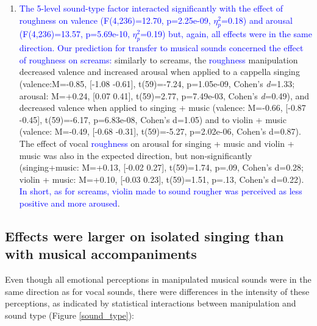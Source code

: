 \documentclass[openacc]{rsprocb_new}%
\begin{document}
\begin{enumerate}
\item \textcolor{blue}{The 5-level sound-type factor interacted significantly with the effect of roughness on valence (F(4,236)=12.70, p=2.25e-09, $\eta_p^2$=0.18) and arousal (F(4,236)=13.57, p=5.69e-10, $\eta_p^2$=0.19) but, again, all effects were in the same direction. Our prediction for transfer to musical sounds concerned the effect of roughness on screams:} similarly to screams, the \textcolor{blue}{roughness} manipulation decreased valence and increased arousal when applied to a cappella singing (valence:M=-0.85, [-1.08 -0.61], t(59)=-7.24, p=1.05e-09, Cohen's \emph{d}=1.33; arousal: M=+0.24, [0.07 0.41], t(59)=2.77, p=7.49e-03, Cohen's \emph{d}=0.49), and decreased valence when applied to singing + music (valence: M=-0.66, [-0.87 -0.45], t(59)=-6.17, p=6.83e-08, Cohen's d=1.05) and to violin + music (valence: M=-0.49, [-0.68 -0.31], t(59)=-5.27, p=2.02e-06, Cohen's d=0.87). The effect of vocal \textcolor{blue}{roughness} on arousal for singing + music and violin + music was also in the expected direction, but non-significantly (singing+music: M=+0.13, [-0.02  0.27], t(59)=1.74, p=.09, Cohen's d=0.28; violin + music: M=+0.10, [-0.03  0.23], t(59)=1.51, p=.13, Cohen's d=0.22).  \textcolor{blue}{In short, as for screams, violin made to sound rougher was perceived as less positive and more aroused}. 
\end{enumerate}

\subsection{Effects were larger on isolated singing than with musical accompaniments}

Even though all emotional perceptions in manipulated musical sounds were in the same direction as for vocal sounds, there were differences in the intensity of these perceptions, as indicated by statistical interactions between manipulation and sound type (Figure \ref{sound_type}):  
\end{document}
